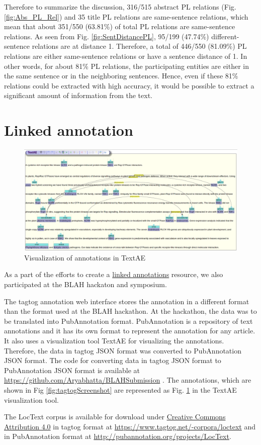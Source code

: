 
Therefore to summarize the discussion, 316/515 abstract PL relations (Fig. \ref{fig:Abs_PL_Rel}) and 35 title PL relations are same-sentence relations, which mean that about 351/550 (63.81\%) of total PL relations are same-sentence relations. As seen from  Fig. \ref{fig:SentDistancePL}, 95/199 (47.74\%) different-sentence relations are at distance 1. Therefore, a total of 446/550 (81.09\%) PL relations are either same-sentence relations or have a sentence distance of 1. In other words, for about 81\% PL relations, the participating entities are either in the same sentence or in the neighboring sentences. Hence, even if these 81\% relations could be extracted with high accuracy, it would be possible to extract a significant amount of information from the text. %

\section{Linked annotation}


\begin{figure}
\centering
\includegraphics[scale=0.25]{figures/TextAE_Vis.png}
\caption{Visualization of annotations in TextAE}\label{fig:TextAEVis}
\end{figure}

As a part of the efforts to create a \hyperref[http://2015.linkedannotation.org/background]{linked annotations} resource, we also participated at the BLAH \cite{blah} hackaton and symposium.

The tagtog annotation web interface stores the annotation in a different format than the format used at the BLAH hackathon. At the hackathon, the data was to be translated into PubAnnotation format. PubAnnotation \cite{kim2012pubannotation} is a repository of text annotations and it has its own format to represent the annotation for any article. It also uses a visualization tool TextAE \cite{textae} for visualizing the annotations. Therefore, the data in tagtog JSON format was converted to PubAnnotation JSON format. The code for converting data in tagtog JSON format to PubAnnotation JSON format is available at \url{https://github.com/Aryabhatta/BLAHSubmission} \cite{blahsubmission}. The annotations, which are shown in Fig \ref{fig:tagtogScreenshot} are represented as Fig. \ref{fig:TextAEVis} in the TextAE visualization tool.

The LocText corpus is available for download under \hyperref[https://creativecommons.org/licenses/by/4.0/]{Creative Commons Attribution 4.0} in tagtog format at \url{https://www.tagtog.net/-corpora/loctext} and in PubAnnotation format at \url{http://pubannotation.org/projects/LocText}.